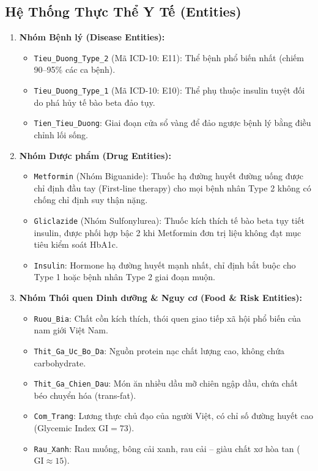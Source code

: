 \documentclass[12pt,a4paper]{report}
\begin{document}
\subsection{Hệ Thống Thực Thể Y Tế (Entities)}
\begin{enumerate}
    \item \textbf{Nhóm Bệnh lý (Disease Entities):}
    \begin{itemize}
        \item \texttt{Tieu\_Duong\_Type\_2} (Mã ICD-10: E11): Thể bệnh phổ biến nhất (chiếm 90--95\% các ca bệnh).
        \item \texttt{Tieu\_Duong\_Type\_1} (Mã ICD-10: E10): Thể phụ thuộc insulin tuyệt đối do phá hủy tế bào beta đảo tụy.
        \item \texttt{Tien\_Tieu\_Duong}: Giai đoạn cửa sổ vàng để đảo ngược bệnh lý bằng điều chỉnh lối sống.
    \end{itemize}
    \item \textbf{Nhóm Dược phẩm (Drug Entities):}
    \begin{itemize}
        \item \texttt{Metformin} (Nhóm Biguanide): Thuốc hạ đường huyết đường uống được chỉ định đầu tay (First-line therapy) cho mọi bệnh nhân Type 2 không có chống chỉ định suy thận nặng.
        \item \texttt{Gliclazide} (Nhóm Sulfonylurea): Thuốc kích thích tế bào beta tụy tiết insulin, được phối hợp bậc 2 khi Metformin đơn trị liệu không đạt mục tiêu kiểm soát HbA1c.
        \item \texttt{Insulin}: Hormone hạ đường huyết mạnh nhất, chỉ định bắt buộc cho Type 1 hoặc bệnh nhân Type 2 giai đoạn muộn.
    \end{itemize}
    \item \textbf{Nhóm Thói quen Dinh dưỡng \& Nguy cơ (Food \& Risk Entities):}
    \begin{itemize}
        \item \texttt{Ruou\_Bia}: Chất cồn kích thích, thói quen giao tiếp xã hội phổ biến của nam giới Việt Nam.
        \item \texttt{Thit\_Ga\_Uc\_Bo\_Da}: Nguồn protein nạc chất lượng cao, không chứa carbohydrate.
        \item \texttt{Thit\_Ga\_Chien\_Dau}: Món ăn nhiều dầu mỡ chiên ngập dầu, chứa chất béo chuyển hóa (trans-fat).
        \item \texttt{Com\_Trang}: Lương thực chủ đạo của người Việt, có chỉ số đường huyết cao (Glycemic Index $\text{GI} = 73$).
        \item \texttt{Rau\_Xanh}: Rau muống, bông cải xanh, rau cải -- giàu chất xơ hòa tan ($\text{GI} \approx 15$).
    \end{itemize}
\end{enumerate}
\end{document}
